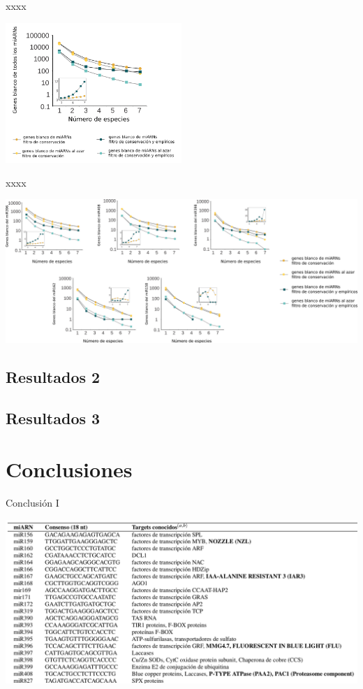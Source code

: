 \documentclass{beamer}
\begin{document}
\begin{frame}{xxxx}
	\begin{center}
		\includegraphics[width=0.5\textwidth]{img/NAR_fig2_05.png}
	\end{center}
\end{frame}

\begin{frame}{xxxx}
	\begin{center}
		\includegraphics[width=1\textwidth]{img/NAR_fig2_bis.png}
	\end{center}
\end{frame}


\subsection{Resultados 2}

\subsection{Resultados 3}


\section{Conclusiones}


\begin{frame}{Conclusión I}
	\begin{center}
		\includegraphics[width=.8\textwidth]{img/miRNAs_y_genes_blancos.png}
	\end{center}
\end{frame}
\end{document}
